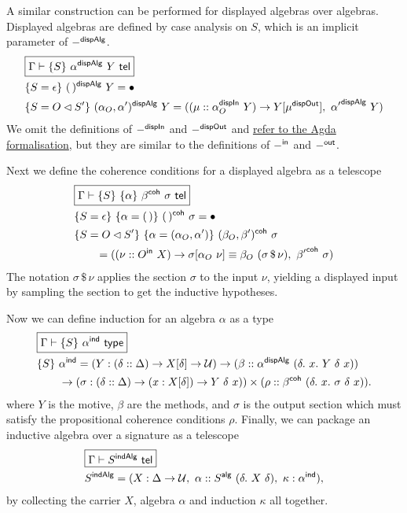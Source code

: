 A similar construction can be performed for displayed algebras over algebras.
Displayed algebras are defined by case analysis on $S$, which is an implicit parameter of $-^{\textsf{dispAlg}}$.
\begin{align*}
&\boxed{\Gamma \vdash \{S\}\ \alpha\D\ Y \tel} \\
& \{S = \epsilon\}\ (\,)\D\ Y = \bullet \\
&\{S = O \lhd S'\}\ (\alpha_O, \alpha')\D\ Y = ((\mu :: \alpha_O\DI\ Y) \to Y[\mu\DO],\ {\alpha'}\D\ Y)
\end{align*}
We omit the definitions of $-^{\textsf{dispIn}}$ and $-^{\textsf{dispOut}}$ and
\href{https://github.com/kontheocharis/rep-agda/blob/e6bd34adaab630f5787c63a95fa86869f6c19da4/TT/Sig.agda\#L107}{refer to the Agda formalisation},
but they are similar to
the definitions of $-^{\textsf{in}}$ and $-^{\textsf{out}}$.

Next we define the coherence conditions for a displayed algebra as a telescope
\begin{align*}
&\boxed{\Gamma \vdash \{S\}\ \{\alpha\}\ \beta^{\textsf{coh}}\ \sigma \ \textsf{tel}} \\
& \{S = \epsilon\}\ \{\alpha = (\,)\}\ (\,)^{\textsf{coh}}\ \sigma = \bullet \\
& \{S = O \lhd S'\}\ \{\alpha = (\alpha_O, \alpha')\}\ (\beta_O, \beta')^{\textsf{coh}}\ \sigma \\
&\qquad = ((\nu :: O^{\textsf{in}}\ X) \to \sigma[\alpha_O\ \nu] \equiv \beta_O\ (\sigma \, \$ \, \nu),\  {\beta'}^{\textsf{coh}}\ \sigma)
\end{align*}
The notation $\sigma \, \$\, \nu$ applies the section $\sigma$ to the input $\nu$,
yielding a displayed input by sampling the section to get the inductive
hypotheses.

Now we can define induction for an algebra $\alpha$ as a type
\begin{align*}
&\boxed{\Gamma \vdash \{S\}\ \alpha\IND \type} \\
&\{S\}\ \alpha\IND = (Y : (\delta :: \Delta) \to X[\delta] \to \univ) \to (\beta :: \alpha\D\ (\delta.\ x.\ Y\ \delta\ x)) \\
&\qquad\to (\sigma : (\delta :: \Delta) \to (x : X[\delta]) \to Y\ \delta\ x)) \times (\rho :: \beta\COH\ (\delta.\ x.\ \sigma\ \delta\ x)).
\end{align*}
where $Y$ is the motive, $\beta$ are the methods, and $\sigma$ is the output section which must
satisfy the propositional coherence conditions $\rho$.
Finally, we can package an inductive algebra over a signature as a telescope
\begin{align*}
&\boxed{\Gamma \vdash S\INDA \tel} \\
&S\INDA = (X : \Delta \to \univ,\ \alpha :: S\A\ (\delta.\ X\ \delta),\ \kappa : \alpha\IND),
\end{align*}
by collecting the carrier $X$, algebra $\alpha$ and induction $\kappa$ all together.

